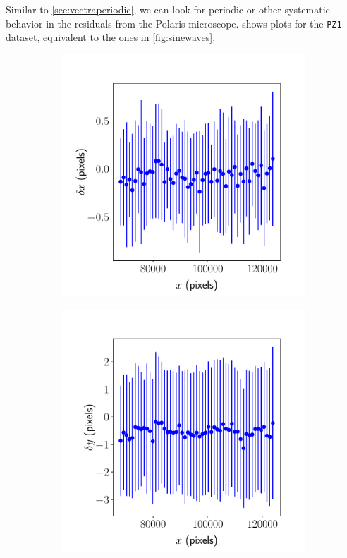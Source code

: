 \documentclass{article}
\begin{document}
Similar to \cref{sec:vectraperiodic}, we can look for periodic or other systematic behavior in the residuals from the Polaris microscope.   shows plots for the \texttt{PZ1} dataset, equivalent to the ones in \cref{fig:sinewaves}.

\begin{figure}[ht]
	\centering
	\begin{subfigure}{0.24\linewidth}
		\includegraphics[width=\linewidth]{sine-wave-2-xx-JHUPolaris.pdf}
		\caption{}
		\label{fig:sinewave2xxJHUPolaris}
	\end{subfigure}
	\begin{subfigure}{0.24\linewidth}
		\includegraphics[width=\linewidth]{sine-wave-2-yx-JHUPolaris.pdf}

\end{subfigure}
\end{figure}
\end{document}
